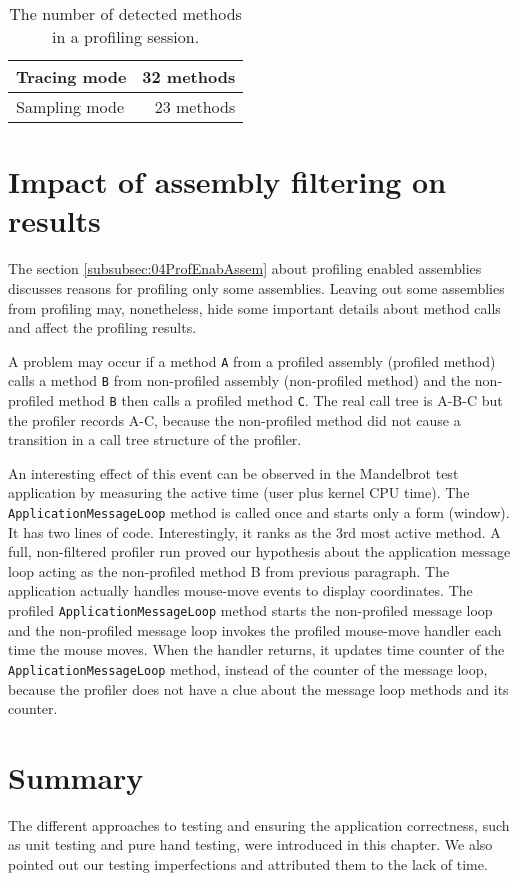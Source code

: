 \begin{table}[h!]
\centering
    \begin{tabular}{|l|r|}
        \hline
        Tracing mode  & 32 methods \\ \hline
        Sampling mode & 23 methods \\
        \hline
    \end{tabular}
     \caption{The number of detected methods in a profiling session. }
    \label{07tbl:compareResultsExactness}
\end{table}

\section{Impact of assembly filtering on results}
The section \ref{subsubsec:04ProfEnabAssem} about profiling enabled assemblies discusses reasons for profiling only some assemblies. Leaving out some assemblies from profiling may, nonetheless, hide some important details about method calls and affect the profiling results. 

A problem may occur if a method \texttt{A} from a profiled assembly (profiled method) calls a method \texttt{B} from non-profiled assembly (non-profiled method) and the non-profiled method \texttt{B} then calls a profiled method \texttt{C}. The real call tree is A-B-C but the profiler records A-C, because the non-profiled method did not cause a transition in a call tree structure of the profiler. 

An interesting effect of this event can be observed in the Mandelbrot test application by measuring the active time (user plus kernel CPU time). The \texttt{ApplicationMessageLoop} method is called once and starts only a form (window). It has two lines of code. Interestingly, it ranks as the 3rd most active method. A full, non-filtered profiler run proved our hypothesis about the application message loop acting as the non-profiled method B from previous paragraph. The application actually handles mouse-move events to display coordinates. The profiled \texttt{ApplicationMessageLoop} method starts the non-profiled message loop and the non-profiled message loop invokes the profiled mouse-move handler each time the mouse moves. When the handler returns, it updates time counter of the \texttt{ApplicationMessageLoop} method, instead of the counter of the message loop, because the profiler does not have a clue about the message loop methods and its counter.

\section{Summary}
The different approaches to testing and ensuring the application correctness, such as unit testing and pure hand testing, were introduced in this chapter. We also pointed out our testing imperfections and attributed them to the lack of time.


